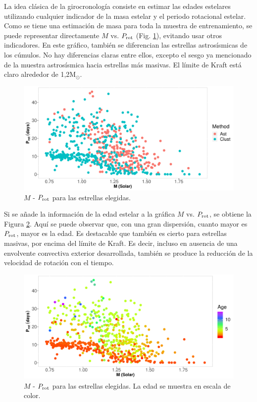 La idea clásica de la girocronología consiste en estimar las edades estelares utilizando cualquier indicador de la masa estelar y el periodo rotacional estelar. Como se tiene una estimación de masa para toda la muestra de entrenamiento, se puede representar directamente $M$ vs. $P_{\rm rot}$ (Fig. \ref{Fig:M_rot}), evitando usar otros indicadores. En este gráfico, también se diferencian las estrellas astrosísmicas de los cúmulos. No hay diferencias claras entre ellos, excepto el sesgo ya mencionado de la muestra astrosísmica hacia estrellas más masivas. El límite de Kraft está claro alrededor de 1,2M$_\odot$.

\begin{figure}[H]
\begin{center}
 \includegraphics[width=0.9\linewidth]{Figuras/M_Prot_embedded.pdf}
\end{center}
\caption{$M$ - $P_{\rm rot}$ para las estrellas elegidas.}
 \label{Fig:M_rot}
\end{figure}


Si se añade la información de la edad estelar a la gráfica $M$ vs. $P_{\rm rot}$, se obtiene la Figura \ref{Fig:M_Age_rot}. Aquí se puede observar que, con una gran dispersión, cuanto mayor es $P_{\rm rot}$, mayor es la edad. Es destacable que también es cierto para estrellas masivas, por encima del límite de Kraft. Es decir, incluso en ausencia de una envolvente convectiva exterior desarrollada, también se produce la reducción de la velocidad de rotación con el tiempo.

\begin{figure}[H]
\begin{center}
 \includegraphics[width=0.8\linewidth]{Figuras/M_Prot_Age_embedded.pdf}
\end{center}
\caption{$M$ - $P_{\rm rot}$ para las estrellas elegidas. La edad se muestra en escala de color.}
 \label{Fig:M_Age_rot}
\end{figure}

